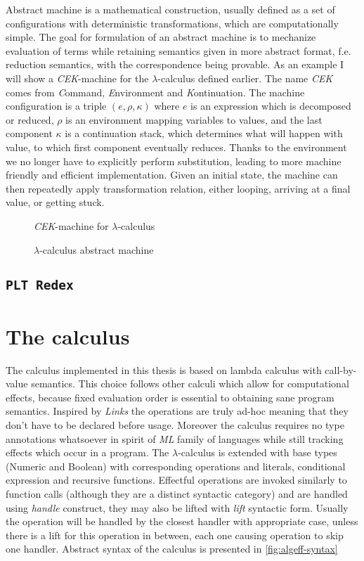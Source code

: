 \documentclass[inz, english, shortabstract]{iithesis}
\newcommand{\Redex}{\texttt{PLT Redex} }
\newcommand{\LC}{\(\lambda\)-calculus }
\begin{document}
Abstract machine is a mathematical construction, usually defined as a set of configurations with deterministic transformations, which are computationally simple.
The goal for formulation of an abstract machine is to mechanize evaluation of terms while retaining semantics given in more abstract format, f.e. reduction semantics, with the correspondence being provable\cite{Felleisen2009}.
As an example I will show a \emph{CEK}-machine for the \LC defined earlier.
The name \emph{CEK} comes from \emph{C}ommand, \emph{E}nvironment and \emph{K}ontinuation.
The machine configuration is a triple $ (e, \rho, \kappa) $ where $ e $ is an expression which is decomposed or reduced, $ \rho $ is an environment mapping variables to values, and the last component $ \kappa $ is a continuation stack, which determines what will happen with value, to which first component eventually reduces.
Thanks to the environment we no longer have to explicitly perform substitution, leading to more machine friendly and efficient implementation.
Given an initial state, the machine can then repeatedly apply transformation relation, either looping, arriving at a final value, or getting stuck. 
\begin{figure}
  \emph{CEK}-machine for \LC
  \caption{\LC abstract machine}
  \label{fig:lc-cek}
\end{figure}

\section{\Redex}

\chapter{The calculus}\label{ch:calculus}
The calculus implemented in this thesis is based on lambda calculus with call-by-value semantics.
This choice follows other calculi which allow for computational effects, because fixed evaluation order is essential to obtaining sane program semantics.
Inspired by \emph{Links} \cite{Hillerstrom2016} the operations are truly ad-hoc meaning that they don't have to be declared before usage.
Moreover the calculus requires no type annotations whatsoever in spirit of \emph{ML} family of languages while still tracking effects which occur in a program.
The \LC is extended with base types (Numeric and Boolean) with corresponding operations and literals, conditional expression and recursive functions.
Effectful operations are invoked similarly to function calls (although they are a distinct syntactic category) and are handled using \textit{handle} construct, they may also be lifted with \textit{lift} syntactic form.
Usually the operation will be handled by the closest handler with appropriate case, unless there is a lift for this operation in between, each one causing operation to skip one handler.
Abstract syntax of the calculus is presented in \autoref{fig:algeff-syntax}
\end{document}
